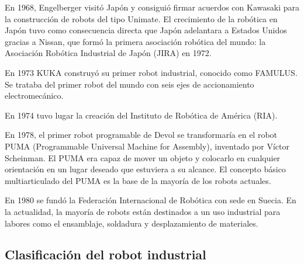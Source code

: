 \documentclass[12pt,a4papert,woside,openright,titlepage,final]{book}
\begin{document}
En 1968, Engelberger visitó Japón y consiguió firmar acuerdos con Kawasaki para
la construcción de robots del tipo Unimate. El crecimiento de la robótica en
Japón tuvo como consecuencia directa que Japón adelantara a Estados Unidos
gracias a Nissan, que formó la primera asociación robótica del mundo: la
Asociación Robótica Industrial de Japón (JIRA) en 1972. 

En 1973 KUKA construyó su primer robot industrial, conocido como FAMULUS. Se
trataba del primer robot del mundo con seis ejes de accionamiento
electromecánico.

En 1974 tuvo lugar la creación del Instituto de
Robótica de América (RIA).

En 1978, el primer robot programable de Devol se transformaría en el robot PUMA
(Programmable Universal Machine for Assembly), inventado por Víctor Scheinman. El PUMA era capaz de mover un
objeto y colocarlo en cualquier orientación en un lugar deseado que estuviera a
su alcance. El concepto básico multiarticulado del PUMA es la base de la mayoría
de los robots actuales.

En 1980 se fundó la Federación Internacional de Robótica con sede en Suecia.
En la actualidad, la mayoría de robots están destinados a un uso industrial para
labores como el ensamblaje, soldadura y desplazamiento de materiales.

\subsection{Clasificación del robot industrial}
\end{document}
